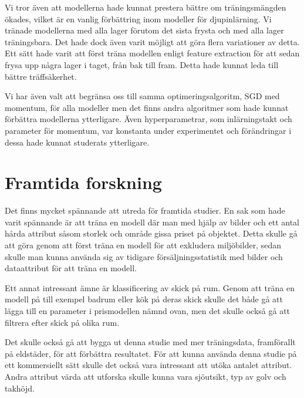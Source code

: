 \documentclass[]{kththesis}
\begin{document}
Vi tror även att modellerna hade kunnat prestera bättre om träningsmängden ökades, vilket är en vanlig förbättring inom modeller för djupinlärning. Vi tränade modellerna med alla lager förutom det sista frysta och med alla lager träningsbara. Det hade dock även varit möjligt att göra flera variationer av detta. Ett sätt hade varit att först träna modellen enligt feature extraction för att sedan frysa upp några lager i taget, från bak till fram. Detta hade kunnat leda till bättre träffsäkerhet. 

Vi har även valt att begränsa oss till samma optimeringsalgoritm, SGD med momentum, för alla modeller men det finns andra algoritmer som hade kunnat förbättra modellerna ytterligare. Även hyperparametrar, som inlärningstakt och parameter för momentum, var konstanta under experimentet och förändringar i dessa hade kunnat studerats ytterligare.


\section{Framtida forskning}
Det finns mycket spännande att utreda för framtida studier.
En sak som hade varit spännande är att träna en modell där man med hjälp av bilder och ett antal hårda attribut såsom storlek och område gissa priset på objektet.
Detta skulle gå att göra genom att först träna en modell för att exkludera miljöbilder, sedan skulle man kunna använda sig av tidigare försäljningsstatistik med bilder och dataattribut för att träna en modell.

Ett annat intressant ämne är klassificering av skick på rum. 
Genom att träna en modell på till exempel badrum eller kök på deras skick skulle det både gå att lägga till en parameter i prismodellen nämnd ovan, men det skulle också gå att filtrera efter skick på olika rum.

Det skulle också gå att bygga ut denna studie med mer träningsdata, framförallt på eldstäder, för att förbättra resultatet.
För att kunna använda denna studie på ett kommersiellt sätt skulle det också vara intressant att utöka antalet attribut. 
Andra attribut värda att utforska skulle kunna vara sjöutsikt, typ av golv och takhöjd.
\end{document}
